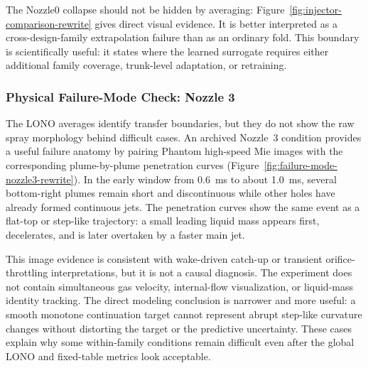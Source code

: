 The Nozzle0 collapse should not be hidden by averaging: Figure~\ref{fig:injector-comparison-rewrite}
gives direct visual evidence. It is better interpreted as a cross-design-family extrapolation
failure than as an ordinary fold. This boundary is scientifically useful: it
states where the learned surrogate requires either additional family coverage,
trunk-level adaptation, or retraining.

\FloatBarrier

\subsubsection{Physical Failure-Mode Check: Nozzle 3}
\label{sec:nozzle3-failure-rewrite}

The LONO averages identify transfer boundaries, but they do not show the raw
spray morphology behind difficult cases. An archived Nozzle~3 condition
provides a useful failure anatomy by pairing Phantom high-speed Mie images with
the corresponding plume-by-plume penetration curves
(Figure~\ref{fig:failure-mode-nozzle3-rewrite}). In the early window from
\SI{0.6}{ms} to about \SI{1.0}{ms}, several bottom-right plumes remain short
and discontinuous while other holes have already formed continuous jets. The
penetration curves show the same event as a flat-top or step-like trajectory:
a small leading liquid mass appears first, decelerates, and is later overtaken
by a faster main jet.

This image evidence is consistent with wake-driven catch-up or transient
orifice-throttling interpretations, but it is not a causal diagnosis. The
experiment does not contain simultaneous gas velocity, internal-flow
visualization, or liquid-mass identity tracking. The direct modeling conclusion
is narrower and more useful: a smooth monotone continuation target cannot
represent abrupt step-like curvature changes without distorting the target or
the predictive uncertainty. These cases explain why some within-family
conditions remain difficult even after the global LONO and fixed-table metrics
look acceptable.

